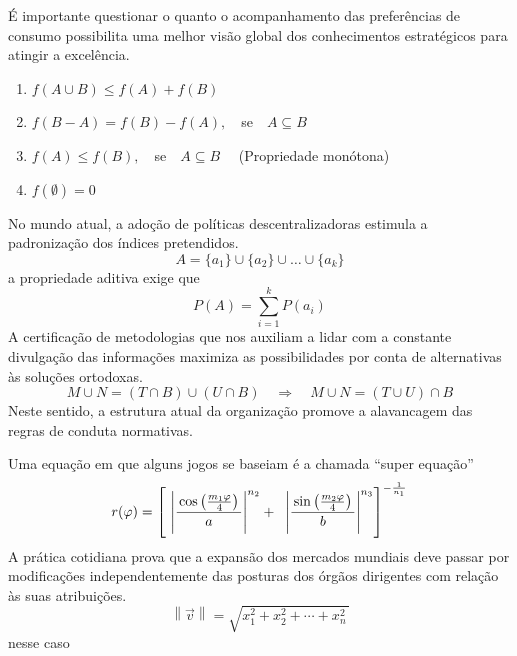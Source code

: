 \begin{apendicesenv}
    É importante questionar o quanto o
    acompanhamento das preferências de consumo possibilita uma melhor visão global
    dos conhecimentos estratégicos para atingir a excelência.
    \begin{enumerate}[label=\alph*)]
        \item $f(A\cup B)\leq f(A)+f(B)$
        \item $f(B-A)=f(B)-f(A), \quad $se$\quad A\subseteq B$
        \item $f(A)\leq f(B), \quad $se$\quad A\subseteq B \quad$ (Propriedade monótona)
        \item $f(\emptyset)=0$
    \end{enumerate}
    No mundo atual, a
    adoção de políticas descentralizadoras estimula a padronização dos índices
    pretendidos.
    \[
        A = \{a_{1}\} \cup \{a_{2}\} \cup \dots \cup \{a_{k} \}
    \]
    a propriedade aditiva exige que
    \[
        P(A) = \sum_{i=1}^{k} P({a_{i}})
    \]
    A certificação de metodologias que nos auxiliam a lidar com a
    constante divulgação das informações maximiza as possibilidades por conta de
    alternativas às soluções ortodoxas.
    \[
        M \cup N = (T \cap B) \cup (U \cap B)
        \quad
        \Rightarrow
        \quad
        M \cup N = (T \cup U) \cap B
    \]
    Neste sentido, a estrutura atual da organização promove a alavancagem das regras
    de conduta normativas.

    Uma equação em que alguns jogos se baseiam é a chamada ``super equação''
    \[
        r( \varphi )=
        \left [\,
        \vphantom{\begin{array}{c}1\\2\\3\\\end{array}}
        \left|
        \frac{\,\cos\left( \frac{m_1\varphi }{4} \right)\,}{a}
        \right|^{n_2} + \;\;
        \left|
        \frac{\,\sin\left( \frac{m_2\varphi }{4} \right)\,}{b}
        \right|^{n_3}
        \right]^{-\frac{1}{n_1}}
    \]
    A prática cotidiana prova que a expansão dos mercados
    mundiais deve passar por modificações independentemente das posturas dos órgãos
    dirigentes com relação às suas atribuições.
    \[
        \left\| \vec{v} \right\| = \sqrt{ x_{1}^{2} + x_{2}^{2} + \cdots + x_{n}^{2} \,}
    \]
    nesse caso


\end{apendicesenv}
